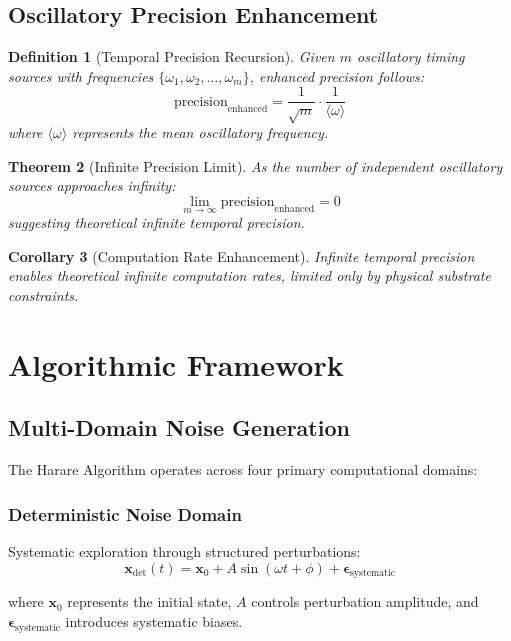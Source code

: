 \documentclass[11pt,a4paper]{article}
\newtheorem{theorem}{Theorem}[section]
\newtheorem{corollary}[theorem]{Corollary}
\newtheorem{definition}[theorem]{Definition}
\theoremstyle{remark}
\begin{document}
\subsection{Oscillatory Precision Enhancement}

\begin{definition}[Temporal Precision Recursion]
Given $m$ oscillatory timing sources with frequencies $\{\omega_1, \omega_2, \ldots, \omega_m\}$, enhanced precision follows:
$$\text{precision}_{\text{enhanced}} = \frac{1}{\sqrt{m}} \cdot \frac{1}{\langle\omega\rangle}$$
where $\langle\omega\rangle$ represents the mean oscillatory frequency.
\end{definition}

\begin{theorem}[Infinite Precision Limit]
As the number of independent oscillatory sources approaches infinity:
$$\lim_{m \to \infty} \text{precision}_{\text{enhanced}} = 0$$
suggesting theoretical infinite temporal precision.
\end{theorem}

\begin{corollary}[Computation Rate Enhancement]
Infinite temporal precision enables theoretical infinite computation rates, limited only by physical substrate constraints.
\end{corollary}

\section{Algorithmic Framework}

\subsection{Multi-Domain Noise Generation}

The Harare Algorithm operates across four primary computational domains:

\subsubsection{Deterministic Noise Domain}

Systematic exploration through structured perturbations:
$$\mathbf{x}_{\text{det}}(t) = \mathbf{x}_0 + A \sin(\omega t + \phi) + \boldsymbol{\epsilon}_{\text{systematic}}$$

where $\mathbf{x}_0$ represents the initial state, $A$ controls perturbation amplitude, and $\boldsymbol{\epsilon}_{\text{systematic}}$ introduces systematic biases.
\end{document}
